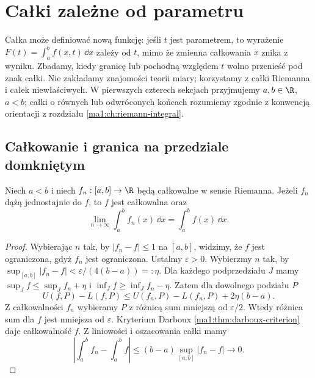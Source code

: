 \chapter{Całki zależne od parametru}
\label{ma1:ch:parameter-integrals}

Całka może definiować nową funkcję: jeśli $t$ jest parametrem, to wyrażenie $F(t)=\int_a^b f(x,t)\,\dd x$ zależy od $t$, mimo że zmienna całkowania $x$ znika z wyniku. Zbadamy, kiedy granicę lub pochodną względem $t$ wolno przenieść pod znak całki. Nie zakładamy znajomości teorii miary; korzystamy z całki Riemanna i całek niewłaściwych. W pierwszych czterech sekcjach przyjmujemy $a,b\in\R$, $a<b$; całki o równych lub odwróconych końcach rozumiemy zgodnie z konwencją orientacji z rozdziału \ref{ma1:ch:riemann-integral}.

\section{Całkowanie i granica na przedziale domkniętym}
\begin{twierdzenie}
\label{ma1:thm:riemann-uniform-limit}
Niech $a<b$ i niech $f_n:[a,b]\to\R$ będą całkowalne w sensie Riemanna. Jeżeli $f_n$ dążą jednostajnie do $f$, to $f$ jest całkowalna oraz
\[
 \lim_{n\to\infty}\int_a^b f_n(x)\,\dd x
 =\int_a^b f(x)\,\dd x.
\]
\end{twierdzenie}
\begin{proof}
Wybierając $n$ tak, by $|f_n-f|\le1$ na $[a,b]$, widzimy, że $f$ jest ograniczona, gdyż $f_n$ jest ograniczona. Ustalmy $\varepsilon>0$. Wybierzmy $n$ tak, by $\sup_{[a,b]}|f_n-f|<\varepsilon/(4(b-a))=:\eta$. Dla każdego podprzedziału $J$ mamy $\sup_J f\le\sup_J f_n+\eta$ i $\inf_J f\ge\inf_J f_n-\eta$. Zatem dla dowolnego podziału $P$
\[
 U(f,P)-L(f,P)\le U(f_n,P)-L(f_n,P)+2\eta(b-a).
\]
Z całkowalności $f_n$ wybieramy $P$ z różnicą sum mniejszą od $\varepsilon/2$. Wtedy różnica sum dla $f$ jest mniejsza od $\varepsilon$. Kryterium Darboux \ref{ma1:thm:darboux-criterion} daje całkowalność $f$. Z liniowości i oszacowania całki mamy
\[
 \left|\int_a^b f_n-\int_a^b f\right|
 \le (b-a)\sup_{[a,b]}|f_n-f|\longrightarrow0.
\]
\end{proof}

